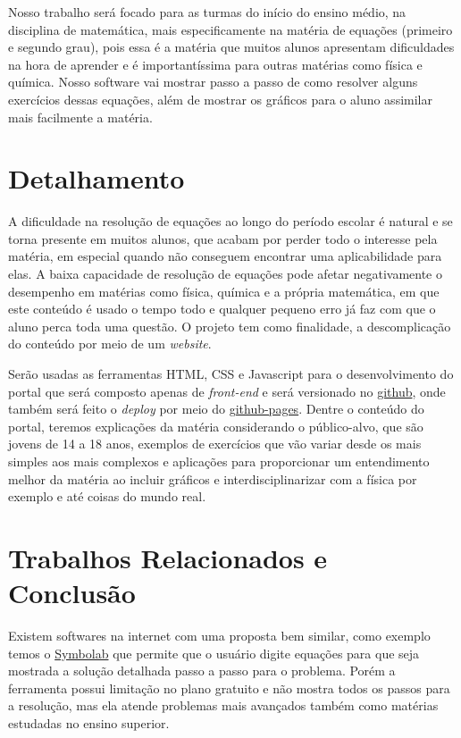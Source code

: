 \documentclass[12pt]{report}
\begin{document}
Nosso trabalho será focado para as turmas do início do ensino médio, na disciplina de matemática, mais especificamente na matéria de equações (primeiro e segundo grau), pois essa é a matéria que muitos alunos apresentam dificuldades na hora de aprender e é importantíssima para outras matérias como física e química. Nosso software vai mostrar passo a passo de como resolver alguns exercícios dessas equações, além de mostrar os gráficos para o aluno assimilar mais facilmente a matéria.

\chapter{Detalhamento}
A dificuldade na resolução de equações ao longo do período escolar é natural e se torna presente em muitos alunos, que acabam por perder todo o interesse pela matéria, em especial quando não conseguem encontrar uma aplicabilidade para elas. A baixa capacidade de resolução de equações pode afetar negativamente o desempenho em matérias como física, química e a própria matemática, em que este conteúdo é usado o tempo todo e qualquer pequeno erro já faz com que o aluno perca toda uma questão. O projeto tem como finalidade, a descomplicação do conteúdo por meio de um \textit{website}.

Serão usadas as ferramentas HTML, CSS e Javascript para o desenvolvimento do portal que será composto apenas de \textit{front-end} e será versionado no \href{https://github.com/Pedenite/PILC-eq}{github}, onde também será feito o \textit{deploy} por meio do \href{https://pedenite.github.io/PILC-eq/}{github-pages}. Dentre o conteúdo do portal, teremos explicações da matéria considerando o público-alvo, que são jovens de 14 a 18 anos, exemplos de exercícios que vão variar desde os mais simples aos mais complexos e aplicações para proporcionar um entendimento melhor da matéria ao incluir gráficos e interdisciplinarizar com a física por exemplo e até coisas do mundo real.

\chapter{Trabalhos Relacionados e Conclusão}
Existem softwares na internet com uma proposta bem similar, como exemplo temos o \href{https://pt.symbolab.com/}{Symbolab} que permite que o usuário digite equações para que seja mostrada a solução detalhada passo a passo para o problema. Porém a ferramenta possui limitação no plano gratuito e não mostra todos os passos para a resolução, mas ela atende problemas mais avançados também como matérias estudadas no ensino superior.
\end{document}

